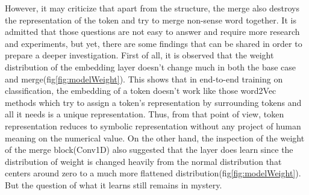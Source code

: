 \documentclass[12pt]{article}
\begin{document}
However, it may criticize that apart from the structure, the merge also destroys the representation of the token and try to merge non-sense word together. It is admitted that those questions are not easy to answer and require more research and experiments, but yet, there are some findings that can be shared in order to prepare a deeper investigation. First of all, it is observed that the weight distribution of the embedding layer doesn't change much\label{context:embeddoesntchange} in both the base case and merge(fig\ref{fig:modelWeight}). This shows that in end-to-end training on classification, the embedding of a token doesn't work like those word2Vec methods which try to assign a token's representation by surrounding tokens and all it needs is a unique representation. Thus, from that point of view, token representation reduces to symbolic representation without any project of human meaning on the numerical value. On the other hand, the inspection of the weight of the merge block(Conv1D) also suggested that the layer does learn since the distribution of weight is changed heavily from the normal distribution that centers around zero to a much more flattened distribution(fig\ref{fig:modelWeight}). But the question of what it learns still remains in mystery. \\
\end{document}
